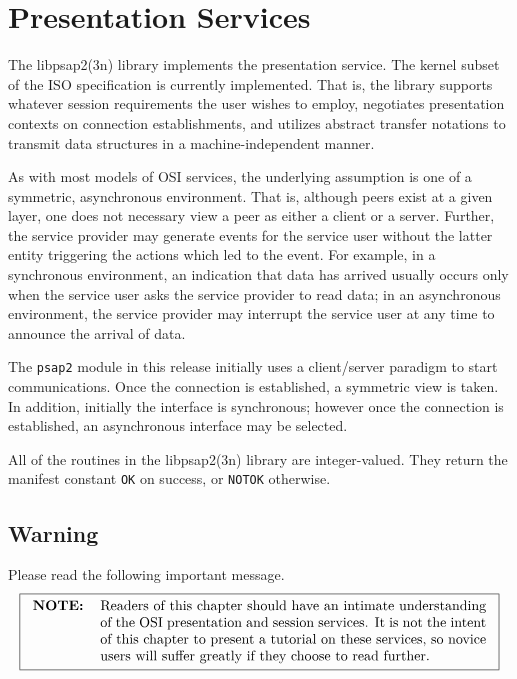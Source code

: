 
\chapter	{Presentation Services}\label{libpsap2}
The \man libpsap2(3n) library implements the presentation service.
The kernel subset of the ISO specification is currently implemented.
That is,
the library supports whatever session requirements the user wishes to
employ,
negotiates presentation contexts on connection establishments,
and utilizes abstract transfer notations to transmit data structures in a
machine-independent manner.

As with most models of OSI services,
the underlying assumption is one of a symmetric, asynchronous environment.
That is,
although peers exist at a given layer,
one does not necessary view a peer as either a client or a server.
Further,
the service provider may generate events for the service user without the
latter entity triggering the actions which led to the event.
For example,
in a synchronous environment,
an indication that data has arrived usually occurs only when the service user
asks the service provider to read data;
in an asynchronous environment,
the service provider may interrupt the service user at any time to announce
the arrival of data.

The \verb"psap2" module in this release initially uses a client/server
paradigm to start communications.
Once the connection is established,
a symmetric view is taken.
In addition,
initially the interface is synchronous;
however once the connection is established,
an asynchronous interface may be selected.

All of the routines in the \man libpsap2(3n) library are integer-valued.
They return the manifest constant \verb"OK" on success,
or \verb"NOTOK" otherwise.

\section	{Warning}
Please read the following important message.
\[\fbox{\begin{tabular}{lp{0.8\textwidth}}
\bf NOTE:&	Readers of this chapter should have an intimate understanding
		of the OSI presentation and session services.
		It is not the intent of this
		chapter to present a tutorial on these services, so novice
		users will suffer greatly if they choose to read further.
\end{tabular}}\]

